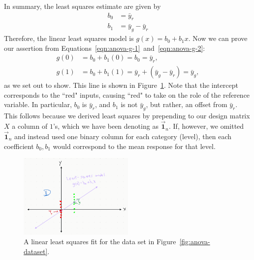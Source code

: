 \documentclass[12pt, a4paper]{article}
\theoremstyle{definition}
\begin{document}
	In summary, the least squares estimate are given by
	\begin{align}
		b_0 &= \bar{y}_r\label{eqn:anova_b0}\\
		b_1 &=\bar{y}_g-\bar{y}_r\label{eqn:anova_b1}
	\end{align}
	Therefore, the linear least squares model is $g(x)=b_0+b_1x$. Now we can
	prove our assertion from Equations~\ref{eqn:anova-g-1}~and~\ref{eqn:anova-g-2}:
	\begin{align*}
		g(0) &= b_0 + b_1(0) = b_0 = \bar{y}_r,\\
		g(1) &= b_0 + b_1(1) = \bar{y}_r + (\bar{y}_g-\bar{y}_r) = \bar{y}_g,
	\end{align*}
	as we set out to show. This line is shown in Figure~\ref{fig:anova-least-squares}.
	Note that the intercept corresponds to the ``red" inputs, causing ``red" to take
	on the role of the reference variable. In particular, $b_0$ is $\bar{y}_r$, and
	$b_1$ is not $\bar{y}_g$, but rather, an offset from $\bar{y}_r$. This follows
	because we derived least squares by prepending to our design matrix $X$ a column
	of $1$'s, which we have been denoting as $\vec{\mathbf{1}}_n$. If, however, we
	omitted $\vec{\mathbf{1}}_n$ and instead used one binary column for each category
	(level), then each coefficient $b_0,b_1$ would correspond to the mean response for
	that level.
	\begin{figure}
		\centering
		\includegraphics[width=0.5\textwidth]{anova-least-squares}
		\caption{A linear least squares fit for the data set in Figure~\ref{fig:anova-dataset}.}
		\label{fig:anova-least-squares}
	\end{figure}
\end{document}
